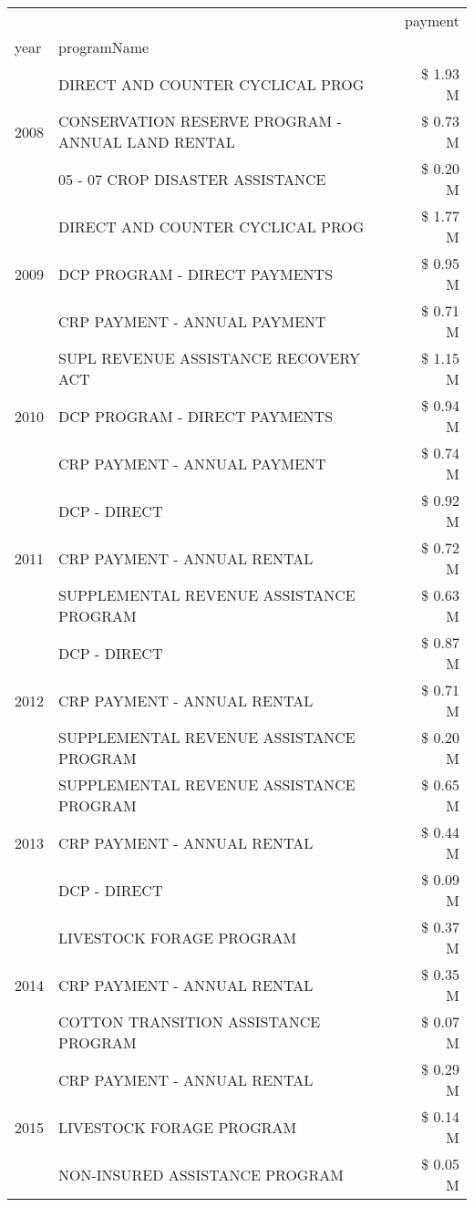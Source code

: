 \begin{tabular}{llr}
\toprule
 &  & payment \\
year & programName &  \\
\midrule
\multirow[t]{3}{*}{2008} & DIRECT AND COUNTER CYCLICAL PROG & \$ 1.93 M \\
 & CONSERVATION RESERVE PROGRAM - ANNUAL LAND RENTAL & \$ 0.73 M \\
 & 05 - 07 CROP DISASTER ASSISTANCE & \$ 0.20 M \\
\cline{1-3}
\multirow[t]{3}{*}{2009} & DIRECT AND COUNTER CYCLICAL PROG & \$ 1.77 M \\
 & DCP PROGRAM - DIRECT PAYMENTS & \$ 0.95 M \\
 & CRP PAYMENT - ANNUAL PAYMENT & \$ 0.71 M \\
\cline{1-3}
\multirow[t]{3}{*}{2010} & SUPL REVENUE ASSISTANCE RECOVERY ACT & \$ 1.15 M \\
 & DCP PROGRAM - DIRECT PAYMENTS & \$ 0.94 M \\
 & CRP PAYMENT - ANNUAL PAYMENT & \$ 0.74 M \\
\cline{1-3}
\multirow[t]{3}{*}{2011} & DCP - DIRECT & \$ 0.92 M \\
 & CRP PAYMENT - ANNUAL RENTAL & \$ 0.72 M \\
 & SUPPLEMENTAL REVENUE ASSISTANCE PROGRAM & \$ 0.63 M \\
\cline{1-3}
\multirow[t]{3}{*}{2012} & DCP - DIRECT & \$ 0.87 M \\
 & CRP PAYMENT - ANNUAL RENTAL & \$ 0.71 M \\
 & SUPPLEMENTAL REVENUE ASSISTANCE PROGRAM & \$ 0.20 M \\
\cline{1-3}
\multirow[t]{3}{*}{2013} & SUPPLEMENTAL REVENUE ASSISTANCE PROGRAM & \$ 0.65 M \\
 & CRP PAYMENT - ANNUAL RENTAL & \$ 0.44 M \\
 & DCP - DIRECT & \$ 0.09 M \\
\cline{1-3}
\multirow[t]{3}{*}{2014} & LIVESTOCK FORAGE PROGRAM & \$ 0.37 M \\
 & CRP PAYMENT - ANNUAL RENTAL & \$ 0.35 M \\
 & COTTON TRANSITION ASSISTANCE PROGRAM & \$ 0.07 M \\
\cline{1-3}
\multirow[t]{3}{*}{2015} & CRP PAYMENT - ANNUAL RENTAL & \$ 0.29 M \\
 & LIVESTOCK FORAGE PROGRAM & \$ 0.14 M \\
 & NON-INSURED ASSISTANCE PROGRAM & \$ 0.05 M \\
\cline{1-3}

\end{tabular}
